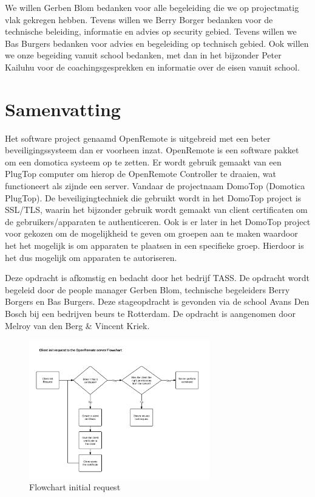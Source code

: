 \documentclass[]{article}
\begin{document}
We willen Gerben Blom bedanken voor alle begeleiding die we op projectmatig vlak
gekregen hebben. Tevens willen we Berry Borger bedanken voor de technische
beleiding, informatie en advies op security gebied. Tevens willen we Bas Burgers
bedanken voor advies en begeleiding op technisch gebied. Ook willen we onze
begeiding vanuit school bedanken, met dan in het bijzonder Peter Kailuhu voor
de coachingsgesprekken en informatie over de eisen vanuit school.

\newpage
\tableofcontents
\newpage
\listoftables
\listoffigures

\newpage
\section*{Samenvatting}
Het software project genaamd OpenRemote is uitgebreid met een beter
beveiligingssysteem dan er voorheen inzat. OpenRemote is een software
pakket om een domotica systeem op te zetten. Er wordt gebruik gemaakt van
een PlugTop computer om hierop de OpenRemote Controller te draaien, wat functioneert als
zijnde een server. Vandaar de projectnaam DomoTop (Domotica PlugTop).
De beveiligingtechniek die gebruikt wordt in het DomoTop project is SSL/TLS,
waarin het bijzonder gebruik wordt gemaakt van client certificaten om de
gebruikers/apparaten te authenticeren. Ook is er later in het DomoTop project
voor gekozen om de mogelijkheid te geven om groepen aan te maken waardoor
het het mogelijk is om apparaten te plaatsen in een specifieke groep. Hierdoor
is het dus mogelijk om apparaten te autoriseren.

Deze opdracht is afkomstig en bedacht door het bedrijf TASS. De opdracht wordt
begeleid door de people manager Gerben Blom, technische begeleiders Berry
Borgers en Bas Burgers. Deze stageopdracht is gevonden via de school Avans Den
Bosch bij een bedrijven beurs te Rotterdam. De opdracht is aangenomen door
Melroy van den Berg \& Vincent Kriek.

\begin{figure}[htpb]
   \begin{center}
     \includegraphics[width=0.7\textwidth]{TopLevelDesignORSecurity.pdf}
   \end{center}
   \caption{Flowchart initial request}
\end{figure}
\end{document}
